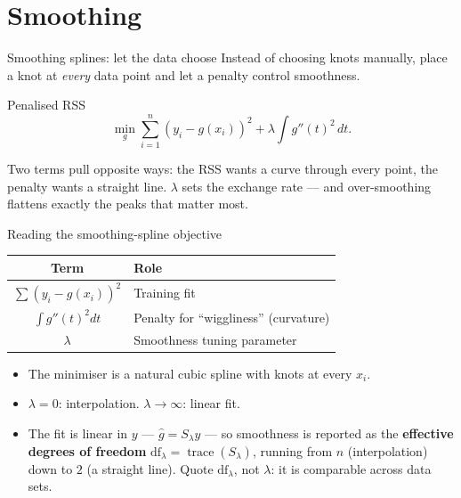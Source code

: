 \documentclass[aspectratio=169,11pt]{beamer}
\begin{document}
\section{Smoothing}

\begin{frame}{Smoothing splines: let the data choose}\label{frm:smoothobj}
  Instead of choosing knots manually, place a knot at \emph{every}
  data point and let a penalty control smoothness.
  \begin{block}{Penalised RSS}
    \[
      \boxed{\;
        \min_{g} \sum_{i=1}^n (y_i - g(x_i))^2 +
        \lambda \int g''(t)^2\,dt.
      \;}
    \]
  \end{block}
  \begin{takeaway}
    Two terms pull opposite ways: the RSS wants a curve through every
    point, the penalty wants a straight line. $\lambda$ sets the exchange
    rate --- and over-smoothing flattens exactly the peaks that matter most.
  \end{takeaway}
\end{frame}

\begin{frame}{Reading the smoothing-spline objective}\label{frm:smoothread}
  \begin{readme}
    \begin{tabular}{@{}cl@{}}
      \toprule
      \textbf{Term} & \textbf{Role} \\
      \midrule
      $\sum (y_i - g(x_i))^2$ & Training fit \\
      $\int g''(t)^2 dt$ & Penalty for ``wiggliness'' (curvature) \\
      $\lambda$ & Smoothness tuning parameter \\
      \bottomrule
    \end{tabular}
  \end{readme}
  \begin{takeaway}
    \begin{itemize}
      \item The minimiser is a natural cubic spline with knots at every
            $x_i$.
      \item $\lambda = 0$: interpolation. $\lambda \to \infty$: linear fit.
      \item The fit is linear in $y$ --- $\hat g = S_\lambda y$ --- so
            smoothness is reported as the \textbf{effective degrees of
            freedom} $\mathrm{df}_\lambda = \operatorname{trace}(S_\lambda)$,
            running from $n$ (interpolation) down to $2$ (a straight line).
            Quote $\mathrm{df}_\lambda$, not $\lambda$: it is comparable
            across data sets.
    \end{itemize}
  \end{takeaway}
\end{frame}
\end{document}
